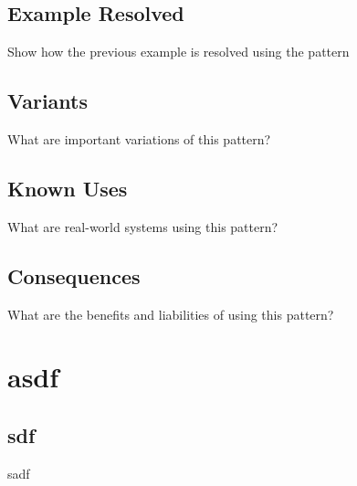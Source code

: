 \documentclass{article}
\begin{document}
\subsection{Example Resolved}
Show how the previous example is resolved using the pattern

\subsection{Variants}
What are important variations of this pattern?

\subsection{Known Uses}
What are real-world systems using this pattern?

\subsection{Consequences}
What are the benefits and liabilities of using this pattern?


\section{asdf}

\subsection{sdf}
sadf
\end{document}
